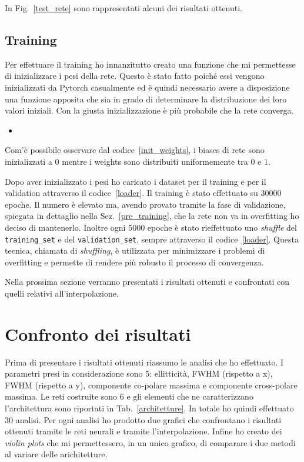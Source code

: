 \documentclass[12pt,a4paper,final]{book}
\newcommand{\insertcode}[2]{\begin{itemize}\item[]\end{itemize}} %
\begin{document}
In Fig.~\ref{test_rete} sono rappresentati alcuni dei risultati ottenuti.



\subsection{Training}\label{training}
Per effettuare il training ho innanzitutto creato una funzione che mi permettesse di inizializzare i pesi della rete. Questo è stato fatto poiché essi vengono inizializzati da Pytorch casualmente ed è quindi necessario avere a disposizione una funzione apposita che sia in grado di determinare la distribuzione dei loro valori iniziali. Con la giusta inizializzazione è più probabile che la rete converga.
\insertcode{../scripts/init_weights.py}{Inizializzazione di weights e biases}\label{init_weights}
Com'è possibile osservare dal codice~\ref{init_weights}, i biases di rete sono inizializzati a $0$ mentre i weights sono distribuiti uniformemente tra $0$ e $1$.


Dopo aver inizializzato i pesi ho caricato i dataset per il training e per il validation attraverso il codice~\ref{loader}.
Il training è stato effettuato su 30000 epoche. Il numero è elevato ma, avendo provato tramite la fase di validazione, spiegata in dettaglio nella Sez.~\ref{pre_training}, che la rete non va in overfitting ho deciso di mantenerlo. 
Inoltre ogni 5000 epoche è stato rieffettuato uno \textit{shuffle} del \texttt{training\_set} e del \texttt{validation\_set}, sempre attraverso il codice~\ref{loader}. Questa tecnica, chiamata di \textit{shuffling}, è utilizzata per minimizzare i problemi di overfitting e permette di rendere più robusto il processo di convergenza.


Nella prossima sezione verranno presentati i risultati ottenuti e confrontati con quelli relativi all'interpolazione.


\section{Confronto dei risultati}\label{risultati}
Prima di presentare i risultati ottenuti riassumo le analisi che ho effettuato. I parametri presi in considerazione sono 5: ellitticità, FWHM (rispetto a x), FWHM (rispetto a y), componente co-polare massima e componente cross-polare massima. Le reti costruite sono 6 e gli elementi che ne caratterizzano l'architettura sono riportati in Tab.~\ref{architetture}. In totale ho quindi effettuato 30 analisi.
Per ogni analisi ho prodotto due grafici che confrontano i risultati ottenuti tramite le  reti neurali e tramite l'interpolazione. Infine ho creato dei \textit{violin plots} che mi permettessero, in un unico grafico, di comparare i due metodi al variare delle arichitetture.
\end{document}
